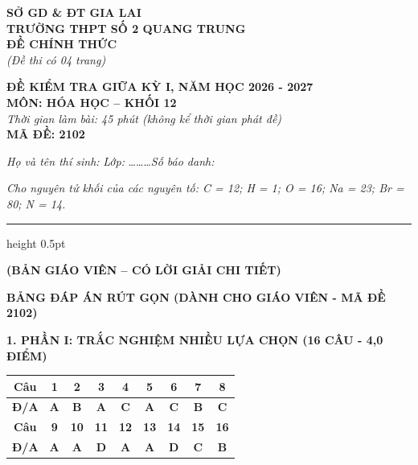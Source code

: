\documentclass[11pt,a4paper]{article}
\begin{document}
\noindent
\begin{minipage}[t]{0.48\textwidth}
\textbf{SỞ GD \& ĐT GIA LAI}\\
\textbf{TRƯỜNG THPT SỐ 2 QUANG TRUNG}\\
\textbf{ĐỀ CHÍNH THỨC}\\
\textit{(Đề thi có 04 trang)}
\end{minipage}
\hfill
\begin{minipage}[t]{0.48\textwidth}
\raggedleft
\textbf{\color{hfRed}ĐỀ KIỂM TRA GIỮA KỲ I, NĂM HỌC 2026 - 2027}\\
\textbf{MÔN: HÓA HỌC -- KHỐI 12}\\
\textit{Thời gian làm bài: 45 phút (không kể thời gian phát đề)}\\
\textbf{MÃ ĐỀ: 2102}
\end{minipage}

\vspace{4pt}
\noindent
\textit{Họ và tên thí sinh:} \dotfill \textit{Lớp:} \dots\dots\dots \textit{Số báo danh:} \dotfill

\vspace{3pt}
\noindent
\textit{\footnotesize Cho nguyên tử khối của các nguyên tố: C = 12; H = 1; O = 16; Na = 23; Br = 80; N = 14.}

\vspace{2pt}
\hrule height 0.5pt


\vspace{4pt}
\begin{center}
\textbf{\color{hfRed}\large (BẢN GIÁO VIÊN -- CÓ LỜI GIẢI CHI TIẾT)}
\end{center}

\vspace{2pt}
\begin{center}
{\color{hfRed}\textbf{\large BẢNG ĐÁP ÁN RÚT GỌN (DÀNH CHO GIÁO VIÊN - MÃ ĐỀ 2102)}}
\end{center}

\vspace{2pt}
\noindent
\textbf{\color{mainGreen}1. PHẦN I: TRẮC NGHIỆM NHIỀU LỰA CHỌN (16 CÂU - 4,0 ĐIỂM)}
\begin{center}
\renewcommand{\arraystretch}{1.2}
\begin{tabular}{|c|c|c|c|c|c|c|c|c|}
\hline
\rowcolor{tableGreen}
\textbf{Câu} & \textbf{1} & \textbf{2} & \textbf{3} & \textbf{4} & \textbf{5} & \textbf{6} & \textbf{7} & \textbf{8} \\
\hline
\textbf{Đ/A} & \textbf{\color{hfRed}A} & \textbf{\color{hfRed}B} & \textbf{\color{hfRed}A} & \textbf{\color{hfRed}C} & \textbf{\color{hfRed}A} & \textbf{\color{hfRed}C} & \textbf{\color{hfRed}B} & \textbf{\color{hfRed}C} \\
\hline
\rowcolor{tableGreen}
\textbf{Câu} & \textbf{9} & \textbf{10} & \textbf{11} & \textbf{12} & \textbf{13} & \textbf{14} & \textbf{15} & \textbf{16} \\
\hline
\textbf{Đ/A} & \textbf{\color{hfRed}A} & \textbf{\color{hfRed}A} & \textbf{\color{hfRed}D} & \textbf{\color{hfRed}A} & \textbf{\color{hfRed}A} & \textbf{\color{hfRed}D} & \textbf{\color{hfRed}C} & \textbf{\color{hfRed}B} \\
\hline
\end{tabular}
\end{center}
\end{document}
